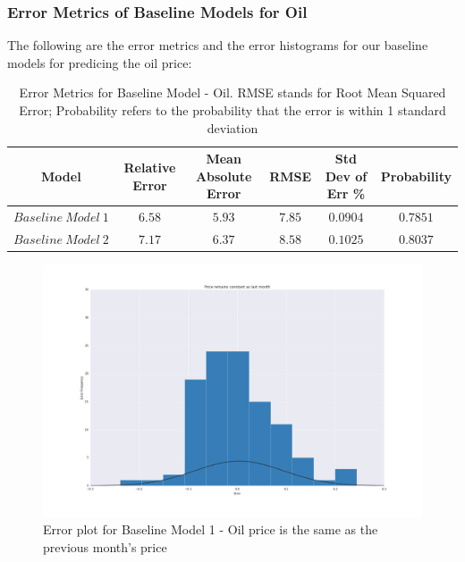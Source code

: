 \documentclass[runningheads]{llncs}
\begin{document}
\subsubsection {Error Metrics of Baseline Models for Oil} 
The following are the error metrics and the error histograms for our baseline models for predicing the oil price:

\begin{table}
\begin{center}
\begin{tabular}{|c|c|c|c|c|c}
\hline
Model & Relative Error & Mean Absolute Error & RMSE & Std Dev of Err \% & Probability \\ \hline
$ Baseline\ Model\ 1 $ & $6.58$ & $5.93$ & $7.85$ & $0.0904$ & $0.7851$ \\ \hline
$ Baseline\ Model\ 2 $ & $7.17$ & $6.37$ & $8.58$ & $0.1025$ & $0.8037$\\ \hline
\end{tabular}
\end{center} 
\caption{Error Metrics for Baseline Model - Oil. 
RMSE stands for Root Mean Squared Error; Probability refers to the probability that the error is within 1 standard deviation}
\end{table}

\begin{figure}
\centering
\includegraphics[width=\textwidth]{BM1_Oil.png}
\caption{Error plot for Baseline Model 1 - Oil price is the same as the previous month's price}
\label{fig:BM1_Oil.png}
\end{figure}
\end{document}
